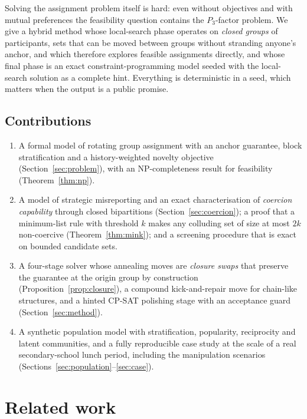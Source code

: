 \documentclass[11pt,a4paper]{article}
\theoremstyle{plain}
\theoremstyle{definition}
\theoremstyle{remark}
\begin{document}
Solving the assignment problem itself is hard: even without objectives and with mutual preferences the feasibility question contains the $P_3$-factor problem. We give a hybrid method whose local-search phase operates on \emph{closed groups} of participants, sets that can be moved between groups without stranding anyone's anchor, and which therefore explores feasible assignments directly, and whose final phase is an exact constraint-programming model seeded with the local-search solution as a complete hint. Everything is deterministic in a seed, which matters when the output is a public promise.

\subsection{Contributions}
\begin{enumerate}[label=(\roman*)]
\item A formal model of rotating group assignment with an anchor guarantee, block stratification and a history-weighted novelty objective (Section~\ref{sec:problem}), with an NP-completeness result for feasibility (Theorem~\ref{thm:np}).
\item A model of strategic misreporting and an exact characterisation of \emph{coercion capability} through closed bipartitions (Section~\ref{sec:coercion}); a proof that a minimum-list rule with threshold $k$ makes any colluding set of size at most $2k$ non-coercive (Theorem~\ref{thm:mink}); and a screening procedure that is exact on bounded candidate sets.
\item A four-stage solver whose annealing moves are \emph{closure swaps} that preserve the guarantee at the origin group by construction (Proposition~\ref{prop:closure}), a compound kick-and-repair move for chain-like structures, and a hinted CP-SAT polishing stage with an acceptance guard (Section~\ref{sec:method}).
\item A synthetic population model with stratification, popularity, reciprocity and latent communities, and a fully reproducible case study at the scale of a real secondary-school lunch period, including the manipulation scenarios (Sections~\ref{sec:population}--\ref{sec:case}).
\end{enumerate}

\section{Related work}
\label{sec:related}
\end{document}
